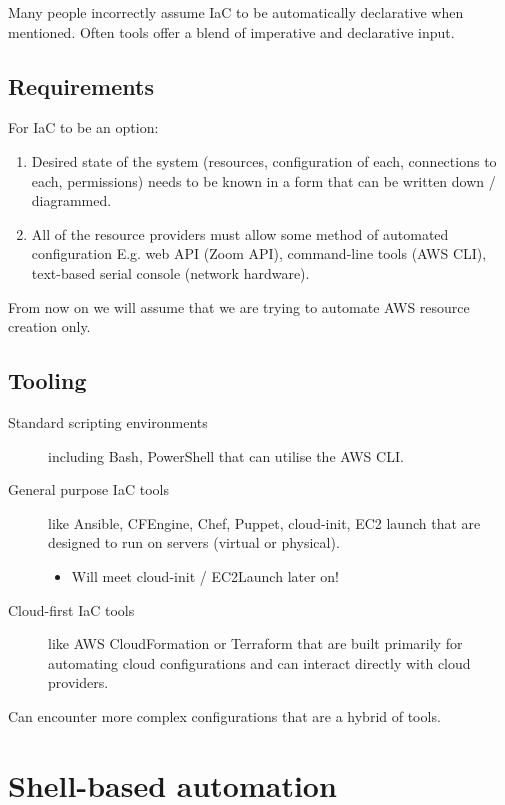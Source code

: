 \documentclass[slides]{pgnotes}
\begin{document}
Many people incorrectly assume IaC to be automatically declarative when
mentioned. Often tools offer a blend of imperative and declarative
input.


\subsection{Requirements}\label{requirements}

For IaC to be an option:

\begin{enumerate}
\item
  Desired state of the system (resources, configuration of each,
  connections to each, permissions) needs to be known in a form that can
  be written down / diagrammed.
\item
  All of the resource providers must allow some method of automated
  configuration E.g. web API (Zoom API), command-line tools (AWS CLI),
  text-based serial console (network hardware).
\end{enumerate}

From now on we will assume that we are trying to automate AWS resource creation only.


\subsection{Tooling}\label{tooling}

\begin{description}
\item[Standard scripting environments]
  including Bash, PowerShell that can utilise the AWS CLI.
\item[General purpose IaC tools]
  like Ansible, CFEngine, Chef, Puppet, cloud-init, EC2 launch that are designed to run on servers (virtual or physical).  
  \begin{itemize}
  \item
    Will meet cloud-init / EC2Launch later on!
  \end{itemize}
\item[Cloud-first IaC tools]
  like AWS CloudFormation or Terraform that are built primarily for automating cloud configurations and can interact directly with cloud providers.
\end{description}

Can encounter more complex configurations that are a hybrid of tools.

\section{Shell-based automation}\label{shell-based-automation}
\end{document}
